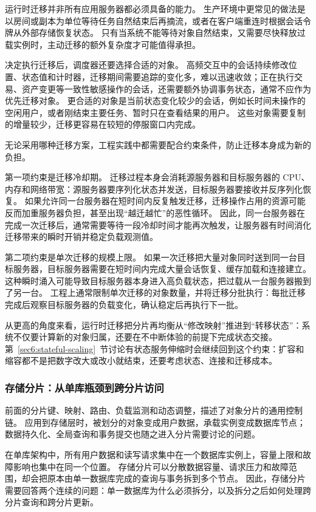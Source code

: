 运行时迁移并非所有应用服务器都必须具备的能力。
生产环境中更常见的做法是以房间或副本为单位等待任务自然结束后再摘流，或者在客户端重连时根据会话令牌从外部存储恢复状态。
只有当系统不能等待对象自然结束，又需要尽快释放过载实例时，主动迁移的额外复杂度才可能值得承担。

决定执行迁移后，调度器还要选择合适的对象。
高频交互中的会话持续修改位置、状态值和计时器，迁移期间需要追踪的变化多，难以迅速收敛；正在执行交易、资产变更等一致性敏感操作的会话，还需要额外协调事务状态，通常不应作为优先迁移对象。
更合适的对象是当前状态变化较少的会话，例如长时间未操作的空闲用户，或者刚结束主要任务、暂时只在查看结果的用户。
这些对象需要复制的增量较少，迁移更容易在较短的停服窗口内完成。

无论采用哪种迁移方案，工程实践中都需要配合约束条件，防止迁移本身成为新的负担。

第一项约束是迁移冷却期。
迁移过程本身会消耗源服务器和目标服务器的 CPU、内存和网络带宽：源服务器要序列化状态并发送，目标服务器要接收并反序列化恢复。
如果允许同一台服务器在短时间内反复触发迁移，迁移操作占用的资源可能反而加重服务器负担，甚至出现“越迁越忙”的恶性循环。
因此，同一台服务器在完成一次迁移后，通常需要等待一段冷却时间才能再次触发，让服务器有时间消化迁移带来的瞬时开销并稳定负载观测值。

第二项约束是单次迁移的规模上限。
如果一次迁移把大量对象同时送到同一台目标服务器，目标服务器需要在短时间内完成大量会话恢复、缓存加载和连接建立。
这种瞬时涌入可能导致目标服务器本身进入高负载状态，把过载从一台服务器搬到了另一台。
工程上通常限制单次迁移的对象数量，并将迁移分批执行：每批迁移完成后观察目标服务器的负载变化，确认稳定后再执行下一批。

从更高的角度来看，运行时迁移把分片再均衡从“修改映射”推进到“转移状态”：系统不仅要计算新的对象归属，还要在不中断体验的前提下完成状态交接。
第~\ref{sec6:stateful-scaling}~节讨论有状态服务伸缩时会继续回到这个约束：扩容和缩容都不是把数字改大或改小就结束，还要考虑状态、连接和迁移成本。


\subsubsection{存储分片：从单库瓶颈到跨分片访问}\label{sec4:storage-sharding-deep-dive}

前面的分片键、映射、路由、负载监测和动态调整，描述了对象分片的通用控制链。
应用到存储层时，被划分的对象变成用户数据，承载实例变成数据库节点；数据持久化、全局查询和事务提交也随之进入分片需要讨论的问题。

在单库架构中，所有用户数据和读写请求集中在一个数据库实例上，容量上限和故障影响也集中在同一个位置。
存储分片可以分散数据容量、请求压力和故障范围，却会把原本由单一数据库完成的查询与事务拆到多个节点。
因此，存储分片需要回答两个连续的问题：单一数据库为什么必须拆分，以及拆分之后如何处理跨分片查询和跨分片更新。

